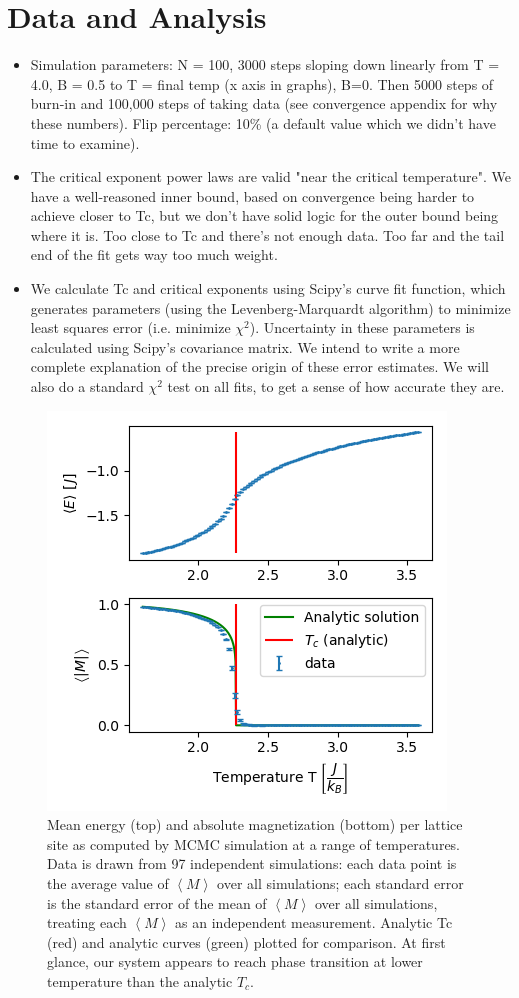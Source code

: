 \documentclass[letter,scriptaddress,twocolumn, prl]{revtex4}
\begin{document}
\section{Data and Analysis}
\begin{itemize}
	\item Simulation parameters: N = 100, 3000 steps sloping down linearly from T = 4.0, B = 0.5 to T = final temp (x axis in graphs), B=0. Then 5000 steps of burn-in and 100,000 steps of taking data (see convergence appendix for why these numbers). Flip percentage: 10\% (a default value which we didn't have time to examine).
	\item The critical exponent power laws are valid "near the critical temperature". We have a well-reasoned inner bound, based on convergence being harder to achieve closer to Tc, but we don't have solid logic for the outer bound being where it is. Too close to Tc and there's not enough data. Too far and the tail end of the fit gets way too much weight.
	\item We calculate Tc and critical exponents using Scipy's curve fit function, which generates parameters (using the Levenberg-Marquardt algorithm) to minimize least squares error (i.e. minimize $\chi^2$). Uncertainty in these parameters is calculated using Scipy's covariance matrix. We intend to write a more complete explanation of the precise origin of these error estimates. We will also do a standard $\chi^2$ test on all fits, to get a sense of how accurate they are.
\end{itemize}

\begin{figure}[h]
	\begin{center}
		\includegraphics[width=.5\textwidth]{figs/fig2_EMplots.png}
		\caption{Mean energy (top) and absolute magnetization (bottom) per lattice site as computed by MCMC simulation at a range of temperatures. Data is drawn from 97 independent simulations: each data point is the average value of $\left\langle M \right\rangle$ over all simulations; each standard error is the standard error of the mean of $\left\langle M \right\rangle$ over all simulations, treating each $\left\langle M \right\rangle$ as an independent measurement. Analytic Tc (red) and analytic curves (green) plotted for comparison. At first glance, our system appears to reach phase transition at lower temperature than the analytic $T_c$.}
		\label{fig:fig2}
	\end{center}
\end{figure}
\end{document}
